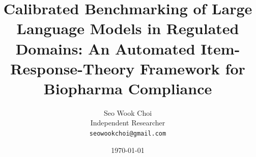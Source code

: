\documentclass[11pt]{article}
\title{Calibrated Benchmarking of Large Language Models in Regulated
Domains: An Automated Item-Response-Theory Framework for Biopharma
Compliance}
\author{%
  Seo Wook Choi \\
  Independent Researcher \\
  \texttt{seowookchoi@gmail.com}
}
\date{\today}
\begin{document}
\maketitle

\begin{abstract}

\end{abstract}

















\end{document}
